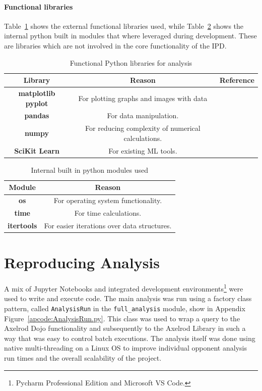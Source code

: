 \paragraph{Functional libraries}
Table~\ref{table:functionalLibrares} shows the external functional libraries used, while Table~\ref{table:builtinmodules} shows the internal python built in modules that where leveraged during development.
These are libraries which are not involved in the core functionality of the IPD\@.
\begin{table}[ht]
    \centering
    \begin{tabular}{ccc}
        \toprule
        Library & Reason & Reference\\
        \midrule
        \textbf{matplotlib pyplot} & For plotting graphs and images with data & \cite{hunter2007matplotlib}\\
        \textbf{pandas} & For data manipulation. & \cite{PandasGithub,Mckinney2010pandas}\\
        \textbf{numpy} & For reducing complexity of numerical calculations.& \cite{oliphant2006numpy}\\
        \textbf{SciKit Learn} & For existing ML tools. & \cite{pedregosa2011scikit}\\
        \bottomrule
    \end{tabular}
    \caption{Functional Python libraries for analysis}\label{table:functionalLibrares}
\end{table}
\begin{table}[ht]
    \centering
    \begin{tabular}{cc}
        \toprule
        Module & Reason\\
        \midrule
        \textbf{os} & For operating system functionality.\\
        \textbf{time} & For time calculations.\\
        \textbf{itertools} & For easier iterations over data structures.\\
        \bottomrule
    \end{tabular}
    \caption{Internal built in python modules used}\label{table:builtinmodules}
\end{table}

\section{Reproducing Analysis}\label{subsec:settingUpAResearchEnvironment}
A mix of Jupyter Notebooks and integrated development environments\footnote{Pycharm Professional Edition and Microsoft VS Code.} were used to write and execute code.
The main analysis was run using a factory class pattern, called \texttt{AnalysisRun} in the \texttt{full_analysis} module, show in Appendix Figure~\ref{apcode:AnalysisRun.py}.
This class was used to wrap a query to the Axelrod Dojo functionality and subsequently to the Axelrod Library in such a way that was easy to control batch executions.
The analysis itself was done using native multi-threading on a Linux OS to improve individual opponent analysis run times and the overall scalability of the project.

